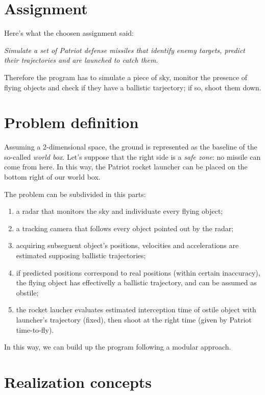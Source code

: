 \documentclass[notitlepage,a4paper,10pt]{article} %
\begin{document}
\section{Assignment}

	Here's what the choosen assignment said:
	\begin{displayquote}
	\emph{Simulate a set of Patriot defense missiles that identify enemy targets, predict their trajectories and are launched to catch them.}
	\end{displayquote}
	Therefore the program has to simulate a piece of sky, monitor the presence of flying objects and check if they have a ballistic tarjectory; if so, shoot them down.

\section{Problem definition}

	Assuming a 2-dimensional space, the ground is represented as the baseline of the so-called \emph{world box}. Let's suppose that the right side is a \emph{safe zone}: no missile can come from here. In this way, the Patriot rocket launcher can be placed on the bottom right of our world box.

	The problem can be subdivided in this parts:
	\begin{enumerate}
		\item a radar that monitors the sky and individuate every flying object;
		\item a tracking camera that follows every object pointed out by the radar;
		\item acquiring subseguent object's positions, velocities and accelerations are estimated supposing ballistic trajectories;
		\item if predicted positions correspond to real positions (within certain inaccuracy), the flying object has effectivelly a ballistic trajectory, and can be assumed as obstile;
		\item the rocket laucher evaluates estimated interception time of ostile object with launcher's trajectory (fixed), then shoot at the right time (given by Patriot time-to-fly).
	\end{enumerate}

	In this way, we can build up the program following a modular approach.

\section{Realization concepts}
\end{document}
